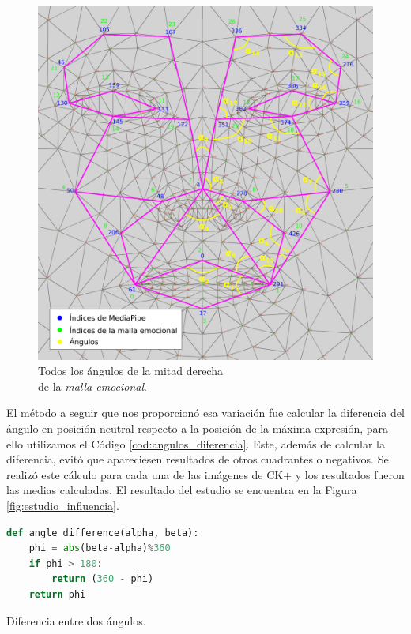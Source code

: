 \begin{figure} [h!]
  \begin{center}
    \includegraphics[width=13cm]{figs/emotional_mesh_todos_angulos.png}
  \end{center}
  \captionsetup{justification=centering}
  \caption{Todos los ángulos de la mitad derecha\\
  de la \textit{malla emocional}.}
  \label{fig:emotional_mesh_todos_angulos}
\end{figure}

El método a seguir que nos proporcionó esa variación fue calcular la diferencia del ángulo en posición neutral respecto a la posición de la máxima expresión, para ello utilizamos el Código \ref{cod:angulos_diferencia}. Este, además de calcular la diferencia, evitó que apareciesen resultados de otros cuadrantes o negativos. Se realizó este cálculo para cada una de las imágenes de CK+ y los resultados fueron las medias calculadas. El resultado del estudio se encuentra en la Figura \ref{fig:estudio_influencia}.\\

\begin{code}[h]
\begin{lstlisting}[language=Python]
def angle_difference(alpha, beta):
    phi = abs(beta-alpha)%360
    if phi > 180:
        return (360 - phi)
    return phi
\end{lstlisting}
\captionsetup{justification=centering}
\caption[Diferencia entre dos ángulos.]{Diferencia entre dos ángulos.}
\label{cod:angulos_diferencia}
\end{code}

